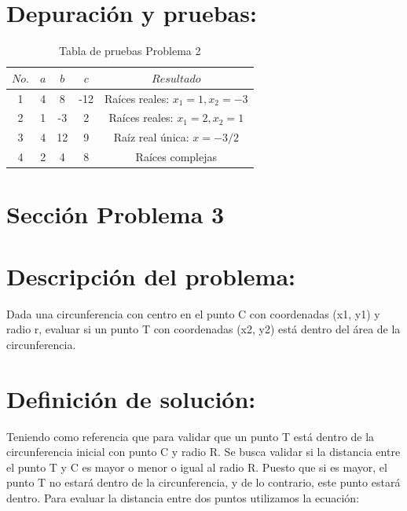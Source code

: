 \documentclass{IEEEcsmag}
\begin{document}
\section*{Depuración y pruebas:}
\begin{table}[h]
     \centering
     \begin{tabular}{|c|c|c|c|c|}
\hline
\textbf{\(No.\)} & \textbf{\(a\)} & \textbf{\(b\)} & \textbf{\(c\)} & \textbf{\(Resultado\)} \\
\hline
1 & 4 & 8 & -12 & Raíces reales: \(x_1 = 1, x_2 = -3\) \\
\hline
2 & 1 & -3 & 2 & Raíces reales: \(x_1 = 2, x_2 = 1\) \\
\hline
3 & 4 & 12 & 9 & Raíz real única: \(x = -3/2\) \\
\hline
4 & 2 & 4 & 8 & Raíces complejas \\
\hline
\end{tabular}
     \label{tab:my_label}
     \caption{Tabla de pruebas Problema 2}
 \end{table}

\section{Sección Problema 3} 
\section*{Descripción del problema:}
Dada una circunferencia con centro en el punto C con coordenadas (x1, y1) y radio r, evaluar si un punto T con coordenadas (x2, y2) está dentro del área de la circunferencia.

\section*{Definición de solución:}
Teniendo como referencia que para validar que un punto T está dentro de la circunferencia inicial con punto C y radio R. Se busca validar si la distancia entre el punto T y C es mayor o menor o igual al radio R.  Puesto que si es mayor, el punto T no estará dentro de la circunferencia, y de lo contrario, este punto estará dentro. 
Para evaluar la distancia entre dos puntos utilizamos la ecuación: 
\newline
\newline
\end{document}
